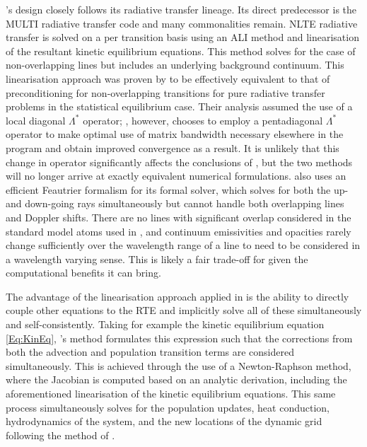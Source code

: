 \Radyn{}'s design closely follows its radiative transfer lineage. Its direct predecessor is the MULTI radiative transfer code \citep{Carlsson1992} and many commonalities remain.
NLTE radiative transfer is solved on a per transition basis using an ALI method and linearisation of the resultant kinetic equilibrium equations.
This method solves for the case of non-overlapping lines but includes an underlying background continuum.
This linearisation approach was proven by \citet{SocasNavarro1997} to be effectively equivalent to that of preconditioning for non-overlapping transitions \citep[i.e. MALI, ][]{Rybicki1991} for pure radiative transfer problems in the statistical equilibrium case.
Their analysis assumed the use of a local diagonal $\Lambda^*$ operator; \Radyn{}, however, chooses to employ a pentadiagonal $\Lambda^*$ operator to make optimal use of matrix bandwidth necessary elsewhere in the program and obtain improved convergence as a result.
It is unlikely that this change in operator significantly affects the conclusions of \citet{SocasNavarro1997}, but the two methods will no longer arrive at exactly equivalent numerical formulations.
\Radyn{} also uses an efficient Feautrier formalism for its formal solver, which solves for both the up- and down-going rays simultaneously but cannot handle both overlapping lines and Doppler shifts.
There are no lines with significant overlap considered in the standard model atoms used in \Radyn{}, and continuum emissivities and opacities rarely change sufficiently over the wavelength range of a line to need to be considered in a wavelength varying sense.
This is likely a fair trade-off for \Radyn{} given the computational benefits it can bring.

The advantage of the linearisation approach applied in \Radyn{} is the ability to directly couple other equations to the RTE and implicitly solve all of these simultaneously and self-consistently.
Taking for example the kinetic equilibrium equation \eqref{Eq:KinEq}, \Radyn{}'s method formulates this expression such that the corrections from both the advection and population transition terms are considered simultaneously.
This is achieved through the use of a Newton-Raphson method, where the Jacobian is computed based on an analytic derivation, including the aforementioned linearisation of the kinetic equilibrium equations.
This same process simultaneously solves for the population updates, heat conduction, hydrodynamics of the system, and the new locations of the dynamic grid following the method of \citet{Dorfi1987}.

